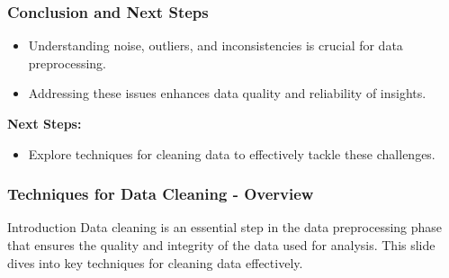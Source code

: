 \documentclass[aspectratio=169]{beamer}
\begin{document}
\begin{frame}[fragile]
    \frametitle{Conclusion and Next Steps}
    \begin{itemize}
        \item Understanding noise, outliers, and inconsistencies is crucial for data preprocessing.
        \item Addressing these issues enhances data quality and reliability of insights.
    \end{itemize}
    
    \textbf{Next Steps:} 
    \begin{itemize}
        \item Explore techniques for cleaning data to effectively tackle these challenges.
    \end{itemize}
\end{frame}

\begin{frame}[fragile]
    \frametitle{Techniques for Data Cleaning - Overview}
    \begin{block}{Introduction}
        Data cleaning is an essential step in the data preprocessing phase that ensures the quality and integrity of the data used for analysis. This slide dives into key techniques for cleaning data effectively.
    \end{block}
\end{frame}
\end{document}
